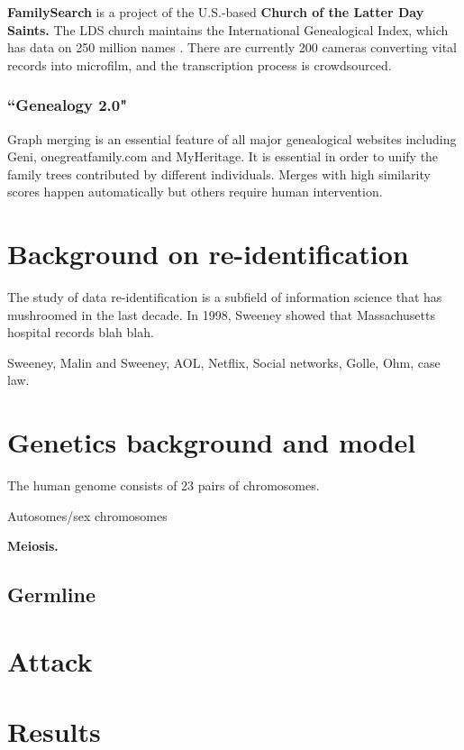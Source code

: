 \documentclass{article}
\begin{document}
{\bf FamilySearch} is a project of the U.S.-based {\bf Church of the  Latter Day Saints.} The LDS church maintains the International Genealogical Index, which has data on 250 million names \cite{familysearch}. There are currently 200 cameras converting vital records into microfilm, and the transcription process is crowdsourced. 

\subsubsection{``Genealogy 2.0"}

Graph merging is  an essential feature of all major genealogical websites including Geni\cite{geni-merge}, onegreatfamily.com\cite{onegreatfamily-merge} and MyHeritage\cite{myheritage-merge}.  It is essential in order to unify the family trees contributed by different individuals.  Merges with high similarity scores happen automatically but others require human intervention.




\section{Background on re-identification}
The study of data re-identification is a subfield of information science that has mushroomed in the last decade. In 1998, Sweeney \cite{sweeney} showed that Massachusetts hospital records blah blah. 

 Sweeney, Malin and Sweeney, AOL, Netflix, Social networks, Golle, Ohm, case law.

\section{Genetics background and model}
The human genome consists of 23 pairs of chromosomes. 

Autosomes/sex chromosomes

{\bf Meiosis.}

\subsection{Germline}

\section{Attack}

\section{Results}
\end{document}
